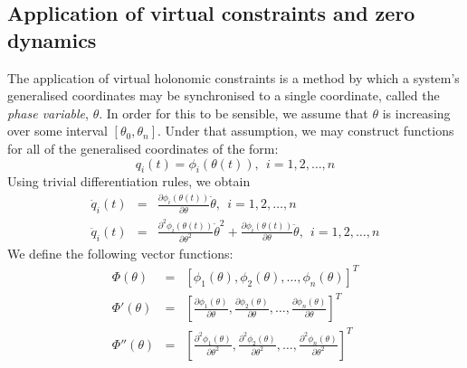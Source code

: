 \subsection{Application of virtual constraints and zero dynamics}
The application of virtual holonomic constraints is a method by which a system's generalised coordinates may be synchronised to a single coordinate, called the \textit{phase variable}, $\theta$. In order for this to be sensible, we assume that $\theta$ is increasing over some interval $[\theta_0, \theta_n]$. Under that assumption, we may construct functions for all of the generalised coordinates of the form:
\begin{equation}
	q_i(t) = \phi_i\left(\theta(t)\right), ~~ i = 1,2,\ldots,n
\end{equation}
Using trivial differentiation rules, we obtain
\begin{eqnarray}
	\dot{q}_i(t) &=& \frac{\partial\phi_i\left(\theta(t)\right)}{\partial\theta}\dot{\theta},
						~~i = 1,2,\ldots,n \\
	\ddot{q}_i(t) &=& \frac{\partial^2\phi_i\left(\theta(t)\right)}{\partial\theta^2}\dot{\theta}^2 +
						\frac{\partial\phi_i\left(\theta(t)\right)}{\partial\theta}\ddot{\theta},
						~~i = 1,2,\ldots,n
\end{eqnarray}
We define the following vector functions:
\begin{eqnarray}
	\Phi\left(\theta\right) &=& \left[ \phi_1\left(\theta\right), \phi_2\left(\theta\right), \ldots,
	\phi_n\left(\theta\right)\right]^T \\
	\Phi'\left(\theta\right) &=& \left[ \frac{\partial\phi_1\left(\theta\right)}{\partial\theta},
	\frac{\partial\phi_2\left(\theta\right)}{\partial\theta}, \ldots ,
	\frac{\partial\phi_n\left(\theta\right)}{\partial\theta} \right]^T \\
	\Phi''\left(\theta\right) &=& \left[ \frac{\partial^2\phi_1\left(\theta\right)}{\partial\theta^2},
	\frac{\partial^2\phi_2\left(\theta\right)}{\partial\theta^2}, \ldots ,
	\frac{\partial^2\phi_n\left(\theta\right)}{\partial\theta^2} \right]^T
\end{eqnarray} ~\\

